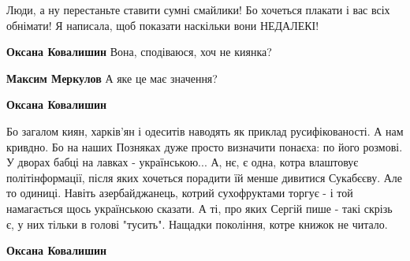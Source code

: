 \begin{itemize}
\begin{itemize}
 
Люди, а ну перестаньте ставити сумні смайлики! Бо хочеться плакати і вас всіх
обнімати! Я написала, щоб показати наскільки вони НЕДАЛЕКІ!

 
\textbf{Оксана Ковалишин} Вона, сподіваюся, хоч не киянка?

 
\textbf{Максим Меркулов} А яке це має значення?

 
\textbf{Оксана Ковалишин} 

Бо загалом киян, харків'ян і одеситів наводять як приклад русифікованості. А
нам кривдно. Бо на наших Позняках дуже просто визначити понаєха: по його
розмові. У дворах бабці на лавках - українською... А, нє, є одна, котра
влаштовує політінформації, після яких хочеться порадити їй менше дивитися
Сукабєєву. Але то одиниці. Навіть азербайджанець, котрий сухофруктами торгує -
і той намагається щось українською сказати. А ті, про яких Сергій пише - такі
скрізь є, у них тільки в голові "тусить". Нащадки покоління, котре книжок не
читало.


 
\textbf{Оксана Ковалишин} 


\end{itemize}
\end{itemize}
